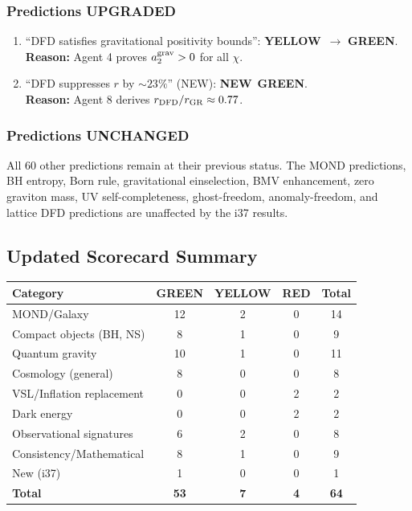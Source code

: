\documentclass[11pt,a4paper]{article}
\newcommand{\GREEN}{\textcolor{dfdgreen}{\textbf{GREEN}}}
\newcommand{\YELLOW}{\textcolor{dfdyellow}{\textbf{YELLOW}}}
\newcommand{\NEW}{\textcolor{dfdblue}{\textbf{NEW}}}
\begin{document}
\subsubsection{Predictions UPGRADED}

\begin{enumerate}
\item[\textbf{P-POS1}] ``DFD satisfies gravitational positivity bounds'': \YELLOW\ $\to$ \GREEN. \\
\textbf{Reason:} Agent 4 proves $a_2^{\rm grav} > 0$ for all $\chi$.

\item[\textbf{P-TSR1}] ``DFD suppresses $r$ by $\sim 23\%$'' (NEW): \NEW\ \GREEN. \\
\textbf{Reason:} Agent 8 derives $r_{\rm DFD}/r_{\rm GR} \approx 0.77$.
\end{enumerate}

\subsubsection{Predictions UNCHANGED}

All 60 other predictions remain at their previous status. The MOND predictions, BH entropy, Born rule, gravitational einselection, BMV enhancement, zero graviton mass, UV self-completeness, ghost-freedom, anomaly-freedom, and lattice DFD predictions are unaffected by the i37 results.

\subsection{Updated Scorecard Summary}

\begin{center}
\begin{tabular}{lcccc}
\toprule
\textbf{Category} & \textbf{GREEN} & \textbf{YELLOW} & \textbf{RED} & \textbf{Total} \\
\midrule
MOND/Galaxy & 12 & 2 & 0 & 14 \\
Compact objects (BH, NS) & 8 & 1 & 0 & 9 \\
Quantum gravity & 10 & 1 & 0 & 11 \\
Cosmology (general) & 8 & 0 & 0 & 8 \\
VSL/Inflation replacement & 0 & 0 & 2 & 2 \\
Dark energy & 0 & 0 & 2 & 2 \\
Observational signatures & 6 & 2 & 0 & 8 \\
Consistency/Mathematical & 8 & 1 & 0 & 9 \\
New (i37) & 1 & 0 & 0 & 1 \\
\midrule
\textbf{Total} & \textbf{53} & \textbf{7} & \textbf{4} & \textbf{64} \\
\bottomrule
\end{tabular}
\end{center}
\end{document}
